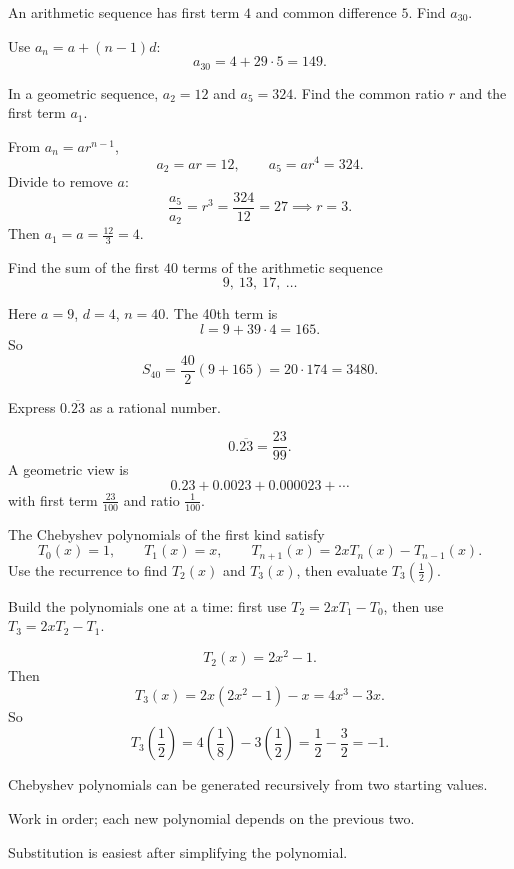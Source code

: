 \begin{problem}
An arithmetic sequence has first term $4$ and common difference $5$.
Find $a_{30}$.
\end{problem}
\begin{solution}
Use $a_n=a+(n-1)d$:
\[
a_{30}=4+29\cdot 5=149.
\]
\end{solution}

\begin{problem}
In a geometric sequence, $a_2=12$ and $a_5=324$. Find the common ratio $r$ and the first term $a_1$.
\end{problem}
\begin{solution}
From $a_n=ar^{n-1}$,
\[
a_2=ar=12,\qquad a_5=ar^4=324.
\]
Divide to remove $a$:
\[
\frac{a_5}{a_2}=r^3=\frac{324}{12}=27 \implies r=3.
\]
Then $a_1=a=\frac{12}{3}=4$.
\end{solution}

\begin{problem}[Sum of an AP]
Find the sum of the first $40$ terms of the arithmetic sequence
\[
9,\ 13,\ 17,\ \ldots
\]
\end{problem}
\begin{solution}
Here $a=9$, $d=4$, $n=40$.
The 40th term is
\[
l=9+39\cdot 4=165.
\]
So
\[
S_{40}=\frac{40}{2}(9+165)=20\cdot 174=3480.
\]
\end{solution}

\begin{problem}
Express $0.\overline{23}$ as a rational number.
\end{problem}
\begin{solution}
\[
0.\overline{23}=\frac{23}{99}.
\]
A geometric view is
\[
0.23+0.0023+0.000023+\cdots
\]
with first term $\frac{23}{100}$ and ratio $\frac{1}{100}$.
\end{solution}

\begin{problem}
The Chebyshev polynomials of the first kind satisfy
\[
T_0(x)=1,\qquad T_1(x)=x,\qquad T_{n+1}(x)=2xT_n(x)-T_{n-1}(x).
\]
Use the recurrence to find $T_2(x)$ and $T_3(x)$, then evaluate $T_3\left(\frac12\right)$.
\end{problem}
\begin{hint}
Build the polynomials one at a time: first use $T_2=2xT_1-T_0$, then use $T_3=2xT_2-T_1$.
\end{hint}
\begin{solution}
\[
T_2(x)=2x^2-1.
\]
Then
\[
T_3(x)=2x(2x^2-1)-x=4x^3-3x.
\]
So
\[
T_3\left(\frac12\right)=4\left(\frac18\right)-3\left(\frac12\right)=\frac12-\frac32=-1.
\]
\end{solution}
\begin{takeaways}
\item Chebyshev polynomials can be generated recursively from two starting values.
\item Work in order; each new polynomial depends on the previous two.
\item Substitution is easiest after simplifying the polynomial.
\end{takeaways}
